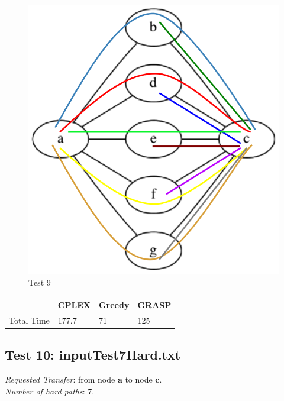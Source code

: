 \documentclass[11pt,a4paper]{article}
\begin{document}
\begin{figure}[H]
  \centering
    \includegraphics[scale=0.6]{inputTest5Hard.png}
  \caption{Test 9}
  \label{fig:test9}
\end{figure}

\begin{tabular}{| l | l | l | l |}
\hline
 & CPLEX & Greedy & GRASP \\ \hline
Total Time & 177.7 & 71 & 125 \\ \hline
\end{tabular}

\subsection{Test 10: inputTest7Hard.txt}

\textit{Requested Transfer}: from node \textbf{a} to node \textbf{c}.\\
\textit{Number of hard paths}: 7.\\
\end{document}
